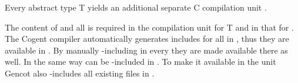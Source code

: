 Every abstract type T yields an additional separate C compilation unit . 

The content of  and all  is required in the compilation unit for T and in 
that for . The Cogent compiler automatically generates includes for all  in 
, 
thus they are available in . By manually -including  in every 
 they are made available there as well. In the same way  can be -included
in . To make it available in the  unit Gencot also -includes all 
existing  files in .

 
